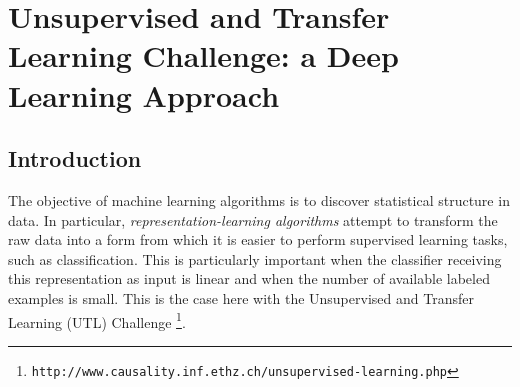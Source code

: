 \newcommand{\squeezeup}{\vspace{-2.5mm}}

\chapter{Unsupervised and Transfer Learning Challenge: a Deep Learning Approach\label{chap:utlc}}

\section{Introduction}


The objective of machine learning algorithms is to discover statistical structure
in data. In particular, {\em representation-learning algorithms} attempt to
transform the raw data into a form from which it is easier to perform
supervised learning tasks, such as classification. This is particularly important
when the classifier receiving this representation as input is linear
and when the number of available labeled examples is small. This is the
case here with the Unsupervised and Transfer Learning (UTL) Challenge
\footnote{\tt http://www.causality.inf.ethz.ch/unsupervised-learning.php}.

